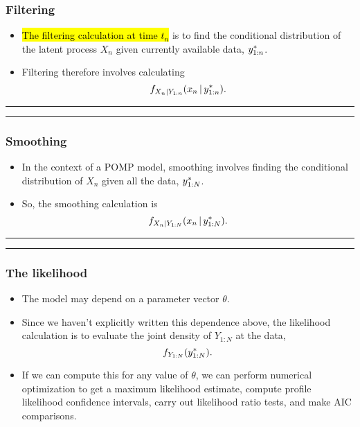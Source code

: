 \documentclass[]{article}
\begin{document}
\subsubsection{Filtering}\label{filtering}

\begin{itemize}
\item
  \hl{The filtering calculation at time $t_n$} is to find the conditional
  distribution of the latent process \(X_n\) given currently available
  data, \(y_{1:n}^*\).
\item
  Filtering therefore involves calculating
  \[f_{X_{n}|Y_{1:n}}(x_n{\, | \,} y_{1:n}^*).\]
  
\end{itemize}

\begin{center}\rule{0.5\linewidth}{\linethickness}\end{center}

\begin{center}\rule{0.5\linewidth}{\linethickness}\end{center}

\subsubsection{Smoothing}\label{smoothing}

\begin{itemize}
\item
  In the context of a POMP model, smoothing involves finding the
  conditional distribution of \(X_n\) given all the data,
  \(y_{1:N}^*\).
\item
  So, the smoothing calculation is
  \[f_{X_{n}|Y_{1:N}}(x_n{\, | \,} y_{1:N}^*).\]
  

\end{itemize}

\begin{center}\rule{0.5\linewidth}{\linethickness}\end{center}

\begin{center}\rule{0.5\linewidth}{\linethickness}\end{center}

\subsubsection{The likelihood}\label{the-likelihood}

\begin{itemize}
\item
  The model may depend on a parameter vector \(\theta\).
\item
  Since we haven't explicitly written this dependence above, the
  likelihood calculation is to evaluate the joint density of \(Y_{1:N}\)
  at the data, \[f_{Y_{1:N}}(y_{1:N}^*).\]
\item
  If we can compute this for any value of \(\theta\), we can perform
  numerical optimization to get a maximum likelihood estimate, compute
  profile likelihood confidence intervals, carry out likelihood ratio
  tests, and make AIC comparisons.
\end{itemize}
\end{document}

